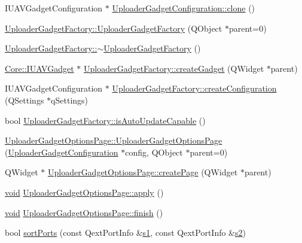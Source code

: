 \begin{DoxyCompactItemize}
\-I\-U\-A\-V\-Gadget\-Configuration $\ast$ \hyperlink{group___y_modem_uploader_gaf15392453c1ff2489f6e03d39d6338e8}{\-Uploader\-Gadget\-Configuration\-::clone} ()
\item 
\hyperlink{group___y_modem_uploader_ga33e544ad20fa638bbf34e7a461d3306e}{\-Uploader\-Gadget\-Factory\-::\-Uploader\-Gadget\-Factory} (\-Q\-Object $\ast$parent=0)
\item 
\hyperlink{group___y_modem_uploader_ga7509287bf0bfbf3b364591ac90155886}{\-Uploader\-Gadget\-Factory\-::$\sim$\-Uploader\-Gadget\-Factory} ()
\item 
\hyperlink{class_core_1_1_i_u_a_v_gadget}{\-Core\-::\-I\-U\-A\-V\-Gadget} $\ast$ \hyperlink{group___y_modem_uploader_gaec0b67dc3c2b6c12df29c01be93457fb}{\-Uploader\-Gadget\-Factory\-::create\-Gadget} (\-Q\-Widget $\ast$parent)
\item 
\-I\-U\-A\-V\-Gadget\-Configuration $\ast$ \hyperlink{group___y_modem_uploader_gada950b4297da08d576452a67d7c42f59}{\-Uploader\-Gadget\-Factory\-::create\-Configuration} (\-Q\-Settings $\ast$q\-Settings)
\item 
bool \hyperlink{group___y_modem_uploader_ga1c32bfa644ec01ae5f98410b24c7f6fd}{\-Uploader\-Gadget\-Factory\-::is\-Auto\-Update\-Capable} ()
\item 
\hyperlink{group___y_modem_uploader_gae4988774405776fb8a06744eb25e596a}{\-Uploader\-Gadget\-Options\-Page\-::\-Uploader\-Gadget\-Options\-Page} (\hyperlink{class_uploader_gadget_configuration}{\-Uploader\-Gadget\-Configuration} $\ast$config, \-Q\-Object $\ast$parent=0)
\item 
\-Q\-Widget $\ast$ \hyperlink{group___y_modem_uploader_ga8f7e89743cc3fc8f9e866c4ebe859a9f}{\-Uploader\-Gadget\-Options\-Page\-::create\-Page} (\-Q\-Widget $\ast$parent)
\item 
\hyperlink{group___u_a_v_objects_plugin_ga444cf2ff3f0ecbe028adce838d373f5c}{void} \hyperlink{group___y_modem_uploader_gaf95a5398d31a86f095fc23d1e7fa878f}{\-Uploader\-Gadget\-Options\-Page\-::apply} ()
\item 
\hyperlink{group___u_a_v_objects_plugin_ga444cf2ff3f0ecbe028adce838d373f5c}{void} \hyperlink{group___y_modem_uploader_ga85b693be9a5e923d0d5bd7f1c0c50fe9}{\-Uploader\-Gadget\-Options\-Page\-::finish} ()
\item 
bool \hyperlink{group___y_modem_uploader_gad78f86e2b854b6285de51dbf32711129}{sort\-Ports} (const \-Qext\-Port\-Info \&\hyperlink{_o_p_plots_8m_a2f07e0f444810cc4e54ee2be2ce0ac65}{s1}, const \-Qext\-Port\-Info \&\hyperlink{_o_p_plots_8m_a2e63e71737e8b6802b81f6a7c5ca6a0a}{s2})

\end{DoxyCompactItemize}
